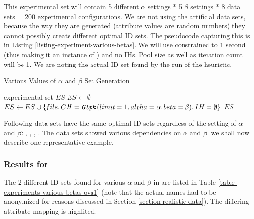 This experimental set will contain 5 different $\alpha$ settings * 5 $\beta$ settings * 8 data sets = 200 experimental configurations. We are not using the artificial data sets, because the way they are generated (attribute values are random numbers) they cannot possibly create different optimal ID sets. The pseudocode capturing this is in Listing \ref{listing-experiment-various-betas}. We will use  constrained to 1 second (thus making it an instance of ) and no IHs. Pool size as well as iteration count will be 1. We are noting the actual ID set found by the run of the heuristic.\\

\begin{algorithm}
\caption{Various Values of $\alpha$ and $\beta$ Set Generation}
\label{listing-experiment-various-betas}
\begin{algorithmic}
\ENSURE experimental set $ES$
\STATE $ES \gets \emptyset$
    	\STATE $ES \gets ES \cup \{file, CH = \texttt{\textit{Glpk}}(limit = 1, alpha = \alpha, beta = \beta), IH = \emptyset\}$
    \ENDFOR
  \ENDFOR
\ENDFOR
\RETURN $ES$
\end{algorithmic}
\end{algorithm}

Following data sets have the same optimal ID sets regardless of the setting of $\alpha$ and $\beta$: , , , . The  data sets showed various dependencies on $\alpha$ and $\beta$, we shall now describe one representative example.

\subsubsection{Results for }

The 2 different ID sets found for various $\alpha$ and $\beta$ in  are listed in Table \ref{table-experiments-various-betas-ova1} (note that the actual names had to be anonymized for reasons discussed in Section \ref{section-realistic-data}). The differing attribute mapping is highlited.

